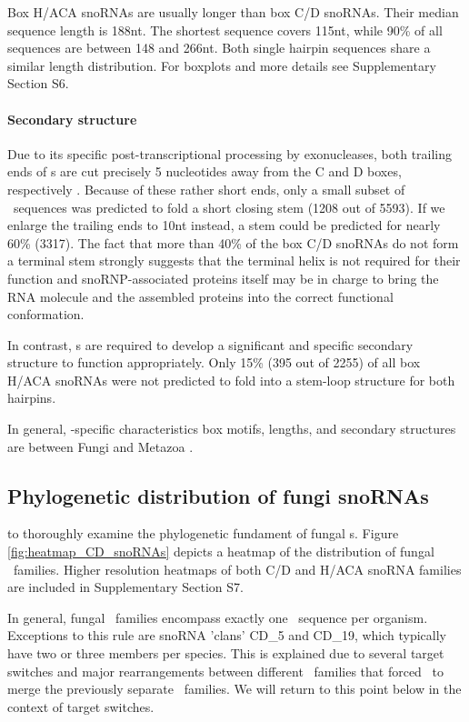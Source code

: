 Box H/ACA snoRNAs are usually longer than box C/D snoRNAs. Their median
sequence length is 188nt. The shortest sequence covers 115nt, while 90\% of
all sequences are between 148 and 266nt.  Both single hairpin sequences
share a similar length distribution. For boxplots and more details see
Supplementary Section S6.

\paragraph{\textbf{Secondary structure}} Due to its specific
post-transcriptional processing by exonucleases, both trailing ends of \cd
s are cut precisely 5 nucleotides away from the C and D boxes, respectively
\citep{Kishore:2013}. Because of these rather short ends, only a small
subset of \sno\ sequences was predicted to fold a short closing stem (1208
out of 5593).  If we enlarge the trailing ends to 10nt instead, a stem
could be predicted for nearly 60\% (3317). The fact that more than 40\% of
the box C/D snoRNAs do not form a terminal stem strongly suggests that the
terminal helix is not required for their function and snoRNP-associated
proteins itself may be in charge to bring the RNA molecule and the
assembled proteins into the correct functional conformation.

In contrast, \haca s are required to develop a significant and
specific secondary structure to function appropriately. Only 15\% (395
out of 2255) of all box H/ACA snoRNAs were not predicted to fold into
a stem-loop structure for both hairpins.

In general, \sno -specific characteristics  box motifs,
lengths, and secondary structures are  between Fungi and
Metazoa \cite{Kehr:2014}.

\subsection{Phylogenetic distribution of fungi snoRNAs}

 to
thoroughly examine the phylogenetic fundament of fungal \sno s.  Figure
\ref{fig:heatmap_CD_snoRNAs} depicts a heatmap of the distribution of
fungal \cd\ families.  Higher resolution heatmaps of both C/D and H/ACA
snoRNA families are included in Supplementary Section S7.

In general, fungal \sno\ families encompass exactly one \sno\ sequence per
organism. Exceptions to this rule are  snoRNA 'clans' CD\_5 and
CD\_19, which typically have two or three members per species.  This is
explained due to several target switches and major rearrangements between
different \sno\ families that forced \snostrip\ to merge the previously
separate \sno\ families. We will return to this point below in the context
of target switches.

